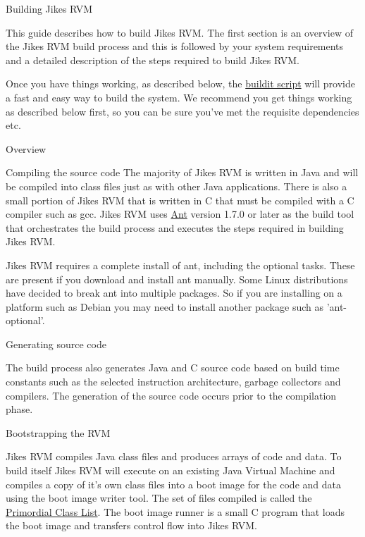 \begin{section}{Building Jikes RVM}

This guide describes how to build Jikes RVM. The first section is an overview of the Jikes RVM build process and this is followed by your system requirements and a detailed description of the steps required to build Jikes RVM.

Once you have things working, as described below, the \hyperref[sec:usingbuildit]{buildit script} will provide a fast and easy way to build the system.  We recommend you get things working as described below first, so you can be sure you've met the requisite dependencies etc.

\begin{subsection}{Overview}

\begin{subsubsection}{Compiling the source code}
The majority of Jikes RVM is written in Java and will be compiled into class files just as with other Java applications. There is also a small portion of Jikes RVM that is written in C that must be compiled with a C compiler such as gcc.  Jikes RVM uses \href{https://ant.apache.org}{Ant} version 1.7.0 or later as the build tool that orchestrates the build process and executes the steps required in building Jikes RVM.

Jikes RVM requires a complete install of ant, including the optional tasks. These are present if you download and install ant manually. Some Linux distributions have decided to break ant into multiple packages. So if you are installing on a platform such as Debian you may need to install another package such as 'ant-optional'.
\end{subsubsection}

\begin{subsubsection}{Generating source code}

The build process also generates Java and C source code based on build time constants such as the selected instruction architecture, garbage collectors and compilers. The generation of the source code occurs prior to the compilation phase.

\end{subsubsection}

\begin{subsubsection}{Bootstrapping the RVM}

Jikes RVM compiles Java class files and produces arrays of code and data. To build itself Jikes RVM will execute on an existing Java Virtual Machine and compiles a copy of it's own class files into a boot image for the code and data using the boot image writer tool. The set of files compiled is called the \hyperref[sec:primordialclasslist]{Primordial Class List}. The boot image runner is a small C program that loads the boot image and transfers control flow into Jikes RVM.


\end{subsubsection}
\end{subsection}
\end{section}
